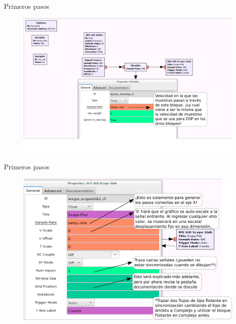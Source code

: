 \begin{frame}{Primeros pasos}
\begin{figure}[H]
\centering
\includegraphics[width=\textwidth]{lab1/pdf/lab1_16.pdf}
\end{figure}
\end{frame}

\begin{frame}{Primeros pasos}
\begin{figure}[H]
\vspace{-3mm}
\centering
\includegraphics[width=.85\textwidth]{lab1/pdf/lab1_17.pdf}
\end{figure}
\end{frame}

